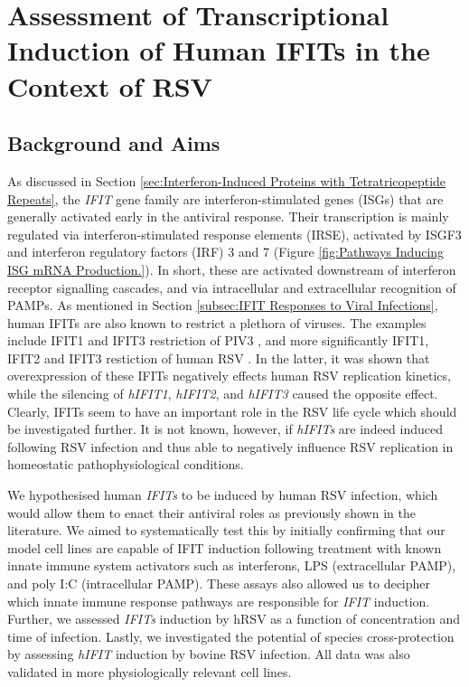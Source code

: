 \chapter{Assessment of Transcriptional Induction of Human IFITs in the Context of RSV} \label{ch:Assessment of Transcriptional Induction of Human IFITs in the Context of RSV}
\section{Background and Aims} \label{sec:Background and Aims-Chapter 1}
As discussed in Section \ref{sec:Interferon-Induced Proteins with Tetratricopeptide Repeats}, the \textit{IFIT} gene family are interferon-stimulated genes (ISGs) that are generally activated early in the antiviral response. Their transcription is mainly regulated via interferon-stimulated response elements (IRSE), activated by ISGF3 and interferon regulatory factors (IRF) 3 and 7 (Figure \ref{fig:Pathways Inducing ISG mRNA Production.}). In short, these are activated downstream of interferon receptor signalling cascades, and via intracellular and extracellular recognition of PAMPs. As mentioned in Section \ref{subsec:IFIT Responses to Viral Infections}, human IFITs are also known to restrict a plethora of viruses. The examples include IFIT1 and IFIT3 restriction of PIV3 \cite{Rabbani2016Identification3}, and more significantly IFIT1, IFIT2 and IFIT3 restiction of human RSV \cite{Drori2020InfluenzaProteins}. In the latter, it was shown that overexpression of these IFITs negatively effects human RSV replication kinetics, while the silencing of \textit{hIFIT1}, \textit{hIFIT2}, and \textit{hIFIT3} caused the opposite effect. Clearly, IFITs seem to have an important role in the RSV life cycle which should be investigated further. It is not known, however, if \textit{hIFITs} are indeed induced following RSV infection and thus able to negatively influence RSV replication in homeostatic pathophysiological conditions.

We hypothesised human \textit{IFITs} to be induced by human RSV infection, which would allow them to enact their antiviral roles as previously shown in the literature. We aimed to systematically test this by initially confirming that our model cell lines are capable of IFIT induction following treatment with known innate immune system activators such as interferons, LPS (extracellular PAMP), and poly I:C (intracellular PAMP). These assays also allowed us to decipher which innate immune response pathways are responsible for \textit{IFIT} induction. Further, we assessed \textit{IFITs} induction by hRSV as a function of concentration and time of infection. Lastly, we investigated the potential of species cross-protection by assessing \textit{hIFIT} induction by bovine RSV infection. All data was also validated in more physiologically relevant cell lines. 

